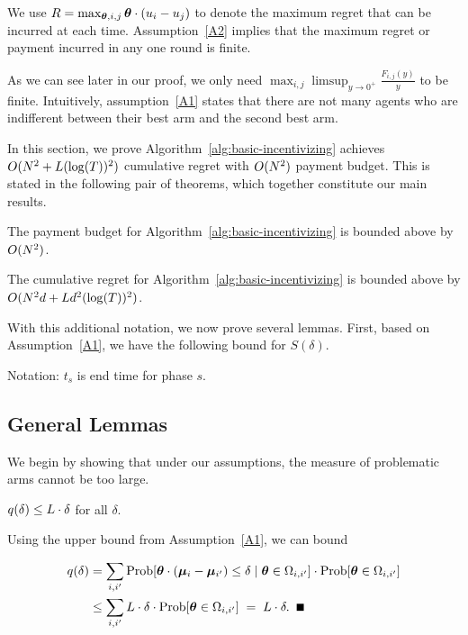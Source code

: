 
We use $R = \max_{\bm{\theta}, i,j} \bm{\theta} \cdot (u_i - u_j)$ to denote the
maximum regret that can be incurred at each time.
Assumption~\ref{A2} implies that the maximum regret or payment
incurred in any one round is finite.

As we can see later in our proof, we only need $\max_{i,j}\limsup_{y\rightarrow 0^{+}}\frac{F_{i,j}(y)}{y}$ to be finite. Intuitively, assumption~\ref{A1} states that there are not many agents who are indifferent between their best arm and the second best arm. 


In this section, we prove Algorithm~\ref{alg:basic-incentivizing} achieves $O(N^2+L(\log(T))^2)$ cumulative regret with $O(N^2)$ payment budget.  This is stated in the following pair of theorems, which together constitute our main results.

\begin{theorem}
The payment budget for Algorithm~\ref{alg:basic-incentivizing} is bounded above by $O(N^2)$. 
\label{rst:budget}
\end{theorem}


\begin{theorem}
The cumulative regret for Algorithm~\ref{alg:basic-incentivizing}
is bounded above by $O(N^2 d + L d^2(\log(T))^2)$.
\label{rst:regret}
\end{theorem}


With this additional notation, we now prove several lemmas.
First, based on Assumption~\ref{A1}, we have the following bound for $S(\delta)$.


Notation: $t_s$ is end time for phase $s$.

\subsection{General Lemmas}

We begin by showing that under our assumptions, the measure of
problematic arms cannot be too large.

\begin{lemma} \label{lem:sdelta}
$q(\delta) \leq L \cdot \delta$ for all $\delta$.
\end{lemma}

\begin{emptyproof}
Using the upper bound from Assumption~\ref{A1}, we can bound

\begin{align*}
\AlmostTied{\delta}
& = \sum_{i,i'} \ProbC{\AgV \cdot (\ArmV{i} - \ArmV{i'}) \leq \delta}%
    {\AgV \in \FirstTwo{i}{i'}}
  \cdot \Prob{\AgV \in \FirstTwo{i}{i'}}\\
& \leq \sum_{i,i'} \TieDensity \cdot \delta
    \cdot \Prob{\AgV \in \FirstTwo{i}{i'}}
\; = \; \TieDensity \cdot \delta. \QED
\end{align*}
\end{emptyproof}

